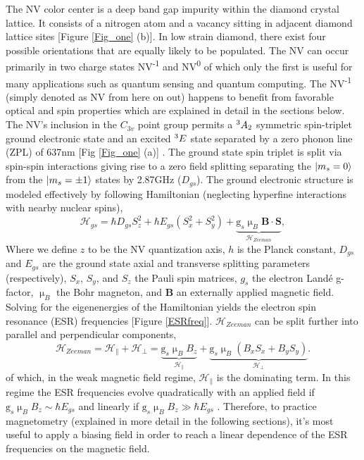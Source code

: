The NV color center is a deep band gap impurity within the diamond crystal lattice. It consists of a nitrogen atom and a vacancy sitting in adjacent diamond lattice sites [Figure \ref{Fig_one} (b)]. In low strain diamond, there exist four possible orientations that are equally likely to be populated. The NV can occur primarily in two charge states NV\textsuperscript{-1} and NV\textsuperscript{0} of which only the first is useful for many applications such as quantum sensing and quantum computing. The NV\textsuperscript{-1} (simply denoted as NV from here on out) happens to benefit from favorable optical and spin properties which are explained in detail in the sections below. The NV's inclusion in the $C_{3v}$ point group permits a $\textsuperscript{3}A_2$ symmetric spin-triplet ground electronic state and an excited $\textsuperscript{3}E$ state separated by a zero phonon line (ZPL) of 637nm [Fig \ref{Fig_one} (a)] \cite{maze2011properties}. The ground state spin triplet is split via spin-spin interactions giving rise to a zero field splitting separating the $\ket{m_s = 0}$ from the $\ket{m_s = \pm 1}$ states by 2.87GHz ($D_{gs}$). 
The ground electronic structure is modeled effectively by following Hamiltonian (neglecting hyperfine interactions with nearby nuclear spins),
\begin{equation}\label{hamiltonian}
\mathcal{H}_{gs} = \hbar D_{gs}S_z^2+\hbar E_{gs}(S_x^2+S_y^2)+\underbrace{\text{g}_s \upmu_B\textbf{B}\cdot\textbf{S}}_{\mathcal{H}_{Zeeman}}, 
\end{equation}
Where we define $z$ to be the NV quantization axis, $h$ is the Planck constant, $D_{gs}$ and $E_{gs}$ are the ground state axial and transverse splitting parameters (respectively), $S_x$, $S_y$, and $S_z$ the Pauli spin matrices, $g_s$ the electron Land\'e g-factor, $\upmu_B$ the Bohr magneton, and $\textbf{B}$ an externally applied magnetic field. Solving for the eigenenergies of the Hamiltonian yields the electron spin resonance (ESR) frequencies [Figure \ref{ESRfreq}]. $\mathcal{H}_{Zeeman}$ can be split further into parallel and perpendicular components,
\begin{equation}
\mathcal{H}_{Zeeman} = \mathcal{H}_{\parallel} + \mathcal{H}_{\perp} = \underbrace{\text{g}_s \upmu_{B}B_{z}}_{\mathcal{H}_{\parallel}} + \underbrace{\text{g}_s \upmu_B(B_x S_x + B_y S_y)}_{\mathcal{H}_{\perp}}.
\end{equation}
of which, in the weak magnetic field regime, $\mathcal{H}_{\parallel}$ is the dominating term. In this regime the ESR frequencies evolve quadratically with an applied field if $\text{g}_s \upmu_B B_z \sim \hbar E_{gs}$ and linearly if $\text{g}_s \upmu_B B_z \gg \hbar E_{gs}$ \cite{rondin2014magnetometry}. Therefore, to practice magnetometry (explained in more detail in the following sections), it's most useful to apply a biasing field in order to reach a linear dependence of the ESR frequencies on the magnetic field. 


